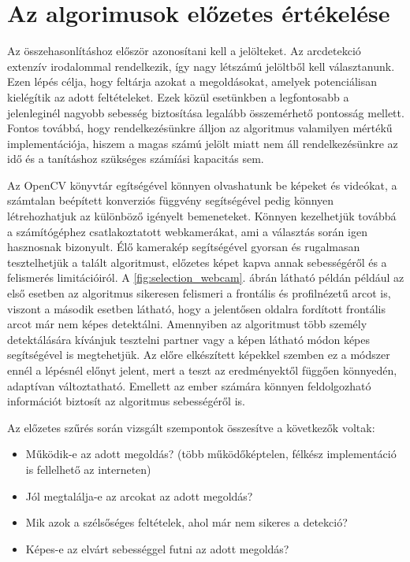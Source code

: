 \section{Az algorimusok előzetes értékelése}
Az összehasonlításhoz először azonosítani kell a jelölteket. Az arcdetekció extenzív irodalommal rendelkezik, így nagy létszámú jelöltből kell választanunk. Ezen lépés célja, hogy feltárja azokat a megoldásokat, amelyek potenciálisan kielégítik az adott feltételeket. Ezek közül esetünkben a legfontosabb a jelenleginél nagyobb sebesség biztosítása legalább összemérhető pontosság mellett. Fontos továbbá, hogy rendelkezésünkre álljon az algoritmus valamilyen mértékű implementációja, hiszem a magas számú jelölt miatt nem áll rendelkezésünkre az idő és a tanításhoz szükséges számíási kapacitás sem.

Az OpenCV könyvtár egítségével könnyen olvashatunk be képeket és videókat, a számtalan beépített konverziós függvény segítségével pedig könnyen létrehozhatjuk az különböző igényelt bemeneteket. Könnyen kezelhetjük továbbá a számítógéphez csatlakoztatott webkamerákat, ami a választás során igen hasznosnak bizonyult. Élő kamerakép segítségével gyorsan és rugalmasan tesztelhetjük a talált algoritmust, előzetes képet kapva annak sebességéről és a felismerés limitációiról. A \ref{fig:selection_webcam}. ábrán látható példán például az első esetben az algoritmus sikeresen felismeri a frontális és profilnézetű arcot is, viszont a második esetben látható, hogy a jelentősen oldalra fordított frontális arcot már nem képes detektálni. Amennyiben az algoritmust több személy detektálására kívánjuk tesztelni partner vagy a képen látható módon képes segítségével is megtehetjük. Az előre elkészített képekkel szemben ez a módszer ennél a lépésnél előnyt jelent, mert a teszt az eredményektől függően könnyedén, adaptívan változtatható. Emellett az ember számára könnyen feldolgozható információt biztosít az algoritmus sebességéről is.

Az előzetes szűrés során vizsgált szempontok összesítve a következők voltak:
\begin{itemize}
    \item Működik-e az adott megoldás? (több működőképtelen, félkész implementáció is fellelhető az interneten)
    \item Jól megtalálja-e az arcokat az adott megoldás?
    \item Mik azok a szélsőséges feltételek, ahol már nem sikeres a detekció?
    \item Képes-e az elvárt sebességgel futni az adott megoldás?
\end{itemize}

